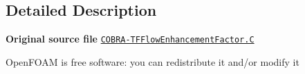 \subsection{Detailed Description}
{\bfseries Original source file} \href{../../../home/carlo/data/GeN-Foam/GeN-Foam_ffn/GeN-Foam/GeN-Foam/classes/thermalHydraulics/src/physicsModels/heatTransferModels/FSHeatTransferCoefficientModels/subModels/flowEnhancementFactorModels/COBRA-TF/COBRA-TFFlowEnhancementFactor.C}{\tt C\+O\+B\+R\+A-\/\+T\+F\+Flow\+Enhancement\+Factor.\+C}

Open\+F\+O\+AM is free software\+: you can redistribute it and/or modify it 